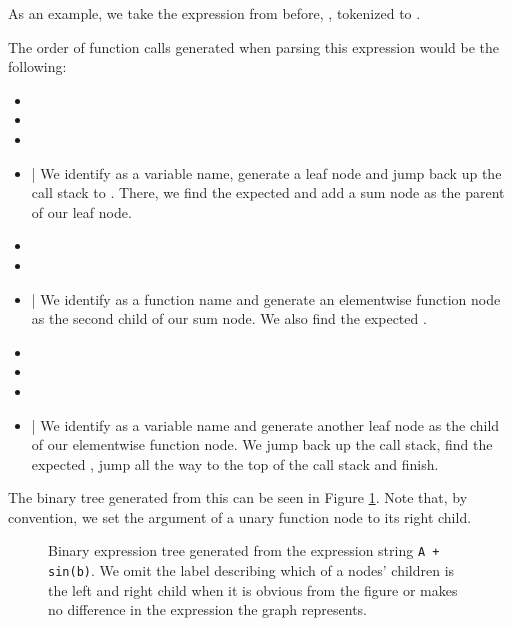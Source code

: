 \documentclass[12pt, a4paper]{report} %
\begin{document}
As an example, we take the expression from before, , tokenized to .

The order of function calls generated when parsing this expression would be the following:
\FloatBarrier
\begin{itemize}
    \setlength\itemsep{0.01em}
    \item {}
    \item {}
    \item {}
    \item {} | We identify  as a variable name, generate a leaf node and jump back up the call stack to . There, we find the expected  and add a sum node as the parent of our leaf node.
    \item {}
    \item {}
    \item {} | We identify  as a function name and generate an elementwise function node as the second child of our sum node. We also find the expected .
    \item {}
    \item {}
    \item {}
    \item {} | We identify  as a variable name and generate another leaf node as the child of our elementwise function node. We jump back up the call stack, find the expected , jump all the way to the top of the call stack and finish.
\end{itemize}
\FloatBarrier
The binary tree generated from this can be seen in Figure \ref{fig:tree_example}.
Note that, by convention, we set the argument of a unary function node to its right child.

\begin{figure}
    \centering
    \caption[Example of Binary Tree Generated from an Expression]{Binary expression tree generated from the expression string \texttt{A + sin(b)}. We omit the label describing which of a nodes' children is the left and right child when it is obvious from the figure or makes no difference in the expression the graph represents.}
    \label{fig:tree_example}
\end{figure}
\end{document}
